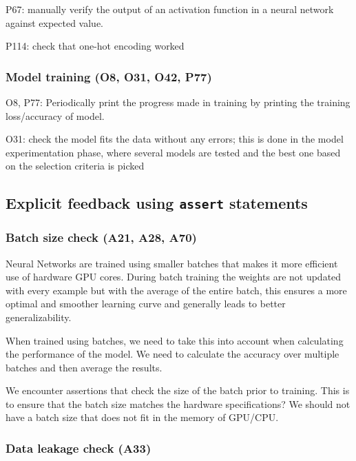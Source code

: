 P67: manually verify the output of an activation function in a neural network against expected value.

P114: check that one-hot encoding worked

\subsubsection{Model training (O8, O31, O42, P77)}

O8, P77: Periodically print the progress made in training by printing the training loss/accuracy of model.

O31: check the model fits the data without any errors; this is done in the model experimentation phase, where several models are tested and the best one based on the selection criteria is picked

\subsection{Explicit feedback using \texttt{assert} statements}


\subsubsection{Batch size check (A21, A28, A70)}

Neural Networks are trained using smaller batches that makes it more efficient use of hardware GPU cores. During batch training the weights are not updated with every example but with the average of the entire batch, this ensures a more optimal and smoother learning curve and generally leads to better generalizability.

When trained using batches, we need to take this into account when calculating the performance of the model. We need to calculate the accuracy over multiple batches and then average the results.

We encounter assertions that check the size of the batch prior to training. This is to ensure that the batch size matches the hardware specifications? We should not have a batch size that does not fit in the memory of GPU/CPU.


\subsubsection{Data leakage check (A33)}

